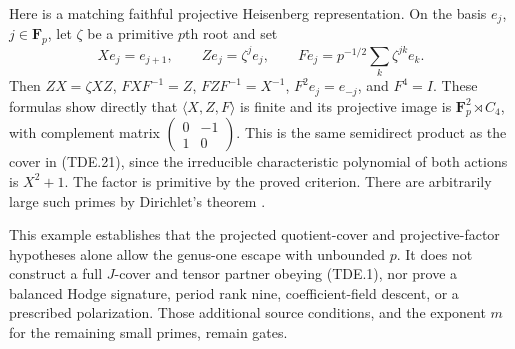 Here is a matching faithful projective Heisenberg representation.
On the basis $e_j$, $j\in\mathbf F_p$, let $\zeta$ be a primitive
$p$th root and set
\[
 Xe_j=e_{j+1},\qquad Ze_j=\zeta^j e_j,\qquad
 Fe_j=p^{-1/2}\sum_k\zeta^{jk}e_k.
 \tag{TDE.22}
\]
Then $ZX=\zeta XZ$, $FXF^{-1}=Z$, $FZF^{-1}=X^{-1}$,
$F^2e_j=e_{-j}$, and $F^4=I$.  These formulas show directly that
$\langle X,Z,F\rangle$ is finite and its projective image is
$\mathbf F_p^2\rtimes C_4$, with complement matrix
$\left(\begin{smallmatrix}0&-1\\1&0\end{smallmatrix}\right)$.
This is the same semidirect product as the cover in (TDE.21),
since the irreducible characteristic polynomial of both actions
is $X^2+1$.  The factor is primitive by the proved criterion.
There are arbitrarily large such primes by Dirichlet's theorem
\cite[Section1, p.~63]{PD:Harrison2009}.

This example establishes that the projected quotient-cover and
projective-factor hypotheses alone allow the genus-one escape
with unbounded $p$.  It does not construct a full $J$-cover and
tensor partner obeying (TDE.1), nor prove a balanced Hodge
signature, period rank nine, coefficient-field descent, or a
prescribed polarization.  Those additional source conditions,
and the exponent $m$ for the remaining small primes, remain gates.
